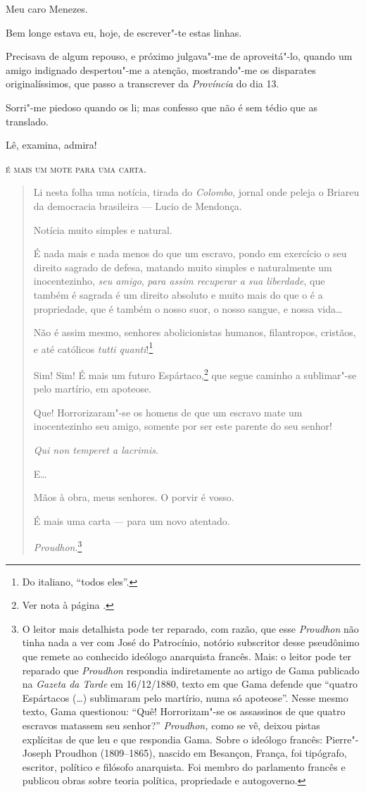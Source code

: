\noindent{}Meu caro Menezes.\smallskip

Bem longe estava eu, hoje, de escrever"-te estas linhas.

Precisava de algum repouso, e próximo julgava"-me de aproveitá"-lo, quando
um amigo indignado despertou"-me a atenção, mostrando"-me os disparates
originalíssimos, que passo a transcrever da \emph{Província} do dia 13.

Sorri"-me piedoso quando os li; mas confesso que não é sem tédio que as
translado.

Lê, examina, admira!

\textsc{é mais um mote para uma carta.}

\begin{quote}
Li nesta folha uma notícia, tirada do \emph{Colombo}, jornal onde peleja
o Briareu da democracia brasileira --- Lucio de Mendonça.

Notícia muito simples e natural.

É nada mais e nada menos do que um escravo, pondo em exercício o seu
direito sagrado de defesa, matando muito simples e naturalmente um
inocentezinho, \emph{seu amigo}, \emph{para assim recuperar a sua
liberdade}, que também é sagrada é um direito absoluto e muito mais do
que o é a propriedade, que é também o nosso suor, o nosso sangue, e
nossa vida\ldots{}

Não é assim mesmo, senhores abolicionistas humanos, filantropos,
cristãos, e até católicos \emph{tutti quanti}!\footnote{Do italiano,
  ``todos eles''.}

\noindent\dotfill{}

Sim! Sim! É mais um futuro Espártaco,\footnote{Ver nota à página \pageref{espartacos}.} que segue caminho a sublimar"-se pelo martírio, em
apoteose.

Que! Horrorizaram"-se os homens de que um escravo mate um inocentezinho
seu amigo, somente por ser este parente do seu senhor!

\emph{Qui non temperet a lacrimis}.

E\ldots{}

Mãos à obra, meus senhores. O porvir é vosso.

É mais uma carta --- para um novo atentado.

\hfill\emph{Proudhon}.\footnote{O leitor mais detalhista pode ter reparado,
  com razão, que esse \emph{Proudhon} não tinha nada a ver com José do
  Patrocínio, notório subscritor desse pseudônimo que remete ao
  conhecido ideólogo anarquista francês. Mais: o leitor pode ter
  reparado que \emph{Proudhon} respondia indiretamente ao artigo de Gama
  publicado na \emph{Gazeta da Tarde} em 16/12/1880, texto em que Gama
  defende que ``quatro Espártacos (\ldots{}) sublimaram pelo martírio, numa só
  apoteose''. Nesse mesmo texto, Gama questionou: ``Quê! Horrorizam"-se os
  assassinos de que quatro escravos matassem seu senhor?''
  \emph{Proudhon,} como se vê, deixou pistas explícitas de que leu e que
  respondia Gama. Sobre o ideólogo francês: Pierre"-Joseph Proudhon
  (1809--1865), nascido em Besançon, França, foi tipógrafo, escritor,
  político e filósofo anarquista. Foi membro do parlamento francês e
  publicou obras sobre teoria política, propriedade e autogoverno.}
\end{quote}

